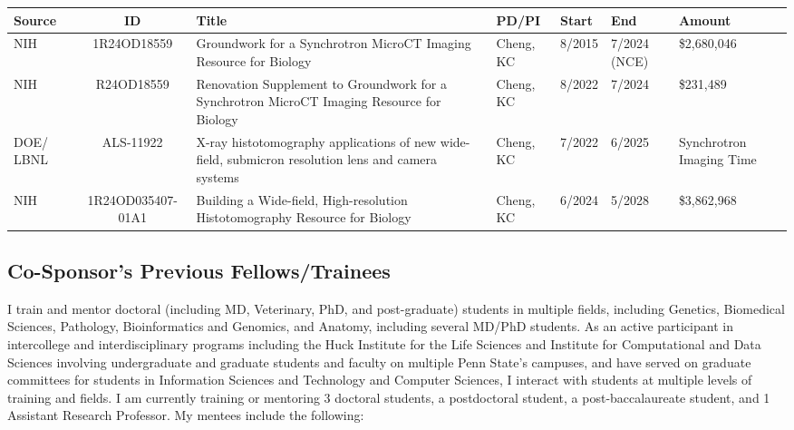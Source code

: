 \documentclass{NIHGrant}
\begin{document}
\begin{center}
\renewcommand{\arraystretch}{1.3}
  \fontsize{9pt}{9pt}\selectfont
  \begin{tabular}{| p{0.5in} | c | p{1.5in} | p{1in} | p{0.5in} | p{0.5in} | p{0.7in} |}
    \hline 
    \textbf{Source} & \textbf{ID} & \textbf{Title} & \textbf{PD/PI} & \textbf{Start} & \textbf{End} & \textbf{Amount} \\
    \hline
    NIH & 1R24OD18559 & Groundwork for a Synchrotron MicroCT Imaging Resource for Biology &  Cheng, KC & 8/2015  & 7/2024 (NCE)&\$2,680,046 \\
    \hline
    NIH & R24OD18559 & Renovation Supplement to Groundwork for a Synchrotron MicroCT Imaging Resource for Biology &  Cheng, KC & 8/2022  & 7/2024 & \$231,489 \\
    \hline
    DOE/ LBNL & ALS-11922 & X-ray histotomography applications of new wide-field, submicron resolution lens and camera systems & Cheng, KC & 7/2022 & 6/2025 & Synchrotron Imaging Time \\
    \hline 
    NIH & 1R24OD035407-01A1 & Building a Wide-field, High-resolution Histotomography Resource for Biology & Cheng, KC & 6/2024 & 5/2028 & \$3,862,968 \\
    \hline
  \end{tabular}
\end{center}

\subsection*{Co-Sponsor's Previous Fellows/Trainees}

I train and mentor doctoral (including MD, Veterinary, PhD, and post-graduate) students in multiple fields, including Genetics, Biomedical Sciences, Pathology, Bioinformatics and Genomics, and Anatomy, including several MD/PhD students. As an active participant in intercollege and interdisciplinary programs including the Huck Institute for the Life Sciences and Institute for Computational and Data Sciences involving undergraduate and graduate students and faculty on multiple Penn State's campuses, and have served on graduate committees for students in Information Sciences and Technology and Computer Sciences, I interact with students at multiple levels of training and fields.  I am currently training or mentoring 3 doctoral students, a postdoctoral student, a post-baccalaureate student, and 1 Assistant Research Professor. My mentees include the following:
\end{document}
